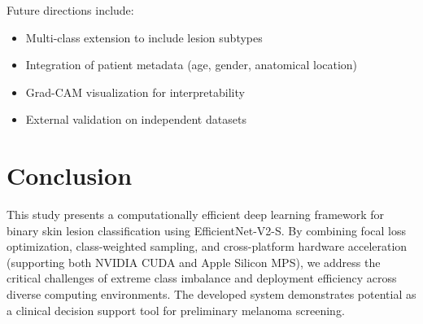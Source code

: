 \documentclass[12pt,a4paper]{article}
\begin{document}
Future directions include:
\begin{itemize}
    \item Multi-class extension to include lesion subtypes
    \item Integration of patient metadata (age, gender, anatomical location)
    \item Grad-CAM visualization for interpretability
    \item External validation on independent datasets
\end{itemize}

\section{Conclusion}
\label{sec:conclusion}

This study presents a computationally efficient deep learning framework for binary skin lesion classification using EfficientNet-V2-S. By combining focal loss optimization, class-weighted sampling, and cross-platform hardware acceleration (supporting both NVIDIA CUDA and Apple Silicon MPS), we address the critical challenges of extreme class imbalance and deployment efficiency across diverse computing environments. The developed system demonstrates potential as a clinical decision support tool for preliminary melanoma screening.

\newpage
\end{document}
